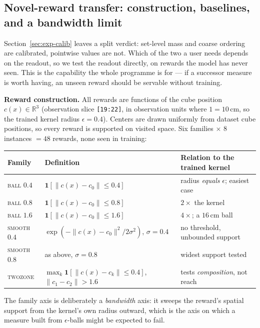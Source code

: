 \documentclass[10pt]{article}
\newcommand{\ind}[1]{\mathbf{1}\!\left[#1\right]}
\begin{document}
\subsection{Novel-reward transfer: construction, baselines, and a bandwidth limit}
\label{sec:exp-l2}

Section~\ref{sec:exp-calib} leaves a split verdict: set-level mass and coarse
ordering are calibrated, pointwise values are not. Which of the two a user needs
depends on the readout, so we test the readout directly, on rewards the model has
never seen. This is the capability the whole programme is for --- if a successor
measure is worth having, an unseen reward should be servable without training.

\textbf{Reward construction.} All rewards are functions of the cube position
$c(x)\in\mathbb{R}^3$ (observation slice \texttt{[19:22]}, in observation units
where $1=10$\,cm, so the trained kernel radius $\epsilon=0.4$). Centers are drawn
uniformly from dataset cube positions, so every reward is supported on visited
space. Six families $\times$ 8 instances $=48$ rewards, none seen in training:

\begin{center}\small
\setlength{\tabcolsep}{6pt}
\begin{tabular}{l l l}
\toprule
\textbf{Family} & \textbf{Definition} & \textbf{Relation to the trained kernel} \\
\midrule
\textsc{ball} $0.4$ & $\ind{\|c(x)-c_0\|\le 0.4}$ & radius \emph{equals} $\epsilon$; easiest case \\
\textsc{ball} $0.8$ & $\ind{\|c(x)-c_0\|\le 0.8}$ & $2\times$ the kernel \\
\textsc{ball} $1.6$ & $\ind{\|c(x)-c_0\|\le 1.6}$ & $4\times$; a $16$\,cm ball \\
\textsc{smooth} $0.4$ & $\exp(-\|c(x)-c_0\|^2/2\sigma^2)$, $\sigma{=}0.4$ & no threshold, unbounded support \\
\textsc{smooth} $0.8$ & as above, $\sigma{=}0.8$ & widest support tested \\
\textsc{twozone} & $\max_k \ind{\|c(x)-c_k\|\le 0.4}$, $\|c_1-c_2\|>1.6$ & tests \emph{composition}, not reach \\
\bottomrule
\end{tabular}
\end{center}

The family axis is deliberately a \emph{bandwidth} axis: it sweeps the reward's
spatial support from the kernel's own radius outward, which is the axis on which
a measure built from $\epsilon$-balls might be expected to fail.
\end{document}
